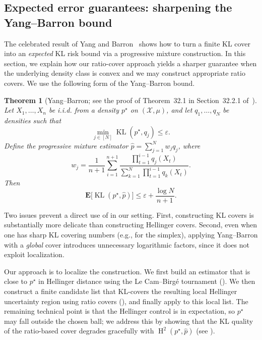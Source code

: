 \documentclass[11pt]{article}
\makeatletter
\newcommand{\E}{{\mathbf E}}
\renewcommand{\le}{\leqslant}
\newcommand{\eps}{\varepsilon}
\newcommand{\X}{\mathcal{X}}
\newcommand{\iid}{i.i.d.\@\xspace}
\renewcommand{\triangleq}{=}
\newcommand{\kl}{\operatorname{KL}}
\newcommand{\hel}{\operatorname{H}}
\newcommand{\hels}{\hel^2}
\newtheorem{theorem}{Theorem}
\theoremstyle{definition}
\theoremstyle{remark}
\makeatother
\begin{document}
\subsection{Expected error guarantees: sharpening the Yang--Barron bound}
\label{sec:yangbarron-sharp}

The celebrated result of Yang and Barron~\cite{yang1999information} shows how to turn a finite KL cover into an \emph{expected} KL risk bound via a progressive mixture construction. In this section, we explain how our ratio-cover approach yields a sharper guarantee when the underlying density class is convex and we may construct appropriate ratio covers. We use the following form of the Yang--Barron bound.

\begin{theorem}[Yang--Barron; see the proof of Theorem~32.1 in Section~32.2.1 of~\cite{polyanskiy2025information}]
\label{thm:yang-barron}
Let $X_{1}, \ldots, X_n$ be \iid from a density $p^\star$ on $(\X,\mu)$, and let $q_1,\dots,q_N$ be densities such that
\[
\min_{j\in[N]}\kl(p^\star,q_j)\le \eps.
\]
Define the progressive mixture estimator $\widehat p \triangleq \sum_{j=1}^N w_j q_j$, where
\[
w_j \triangleq \frac{1}{n+1}\sum_{i=1}^{n+1}
\frac{\prod_{t=1}^{i-1} q_j(X_t)}{\sum_{k=1}^N \prod_{t=1}^{i-1} q_k(X_t)}.
\]
Then
\[
\E\big[\kl(p^\star,\widehat p)\big]\le \eps + \frac{\log N}{n+1}.
\]
\end{theorem}

Two issues prevent a direct use of  in our setting. First, constructing KL covers is substantially more delicate than constructing Hellinger covers. Second, even when one has sharp KL covering numbers (e.g., for the simplex), applying Yang--Barron with a \emph{global} cover introduces unnecessary logarithmic factors, since it does not exploit localization.

Our approach is to localize the construction. We first build an estimator that is close to $p^\star$ in Hellinger distance using the Le Cam--Birg\'e tournament (). We then construct a finite candidate list that KL-covers the resulting local Hellinger uncertainty region using ratio covers (), and finally apply  to this local list. The remaining technical point is that the Hellinger control is in expectation, so $p^\star$ may fall outside the chosen ball; we address this by showing that the KL quality of the ratio-based cover degrades gracefully with $\hels(p^\star,\widehat p)$ (see ).
\end{document}
